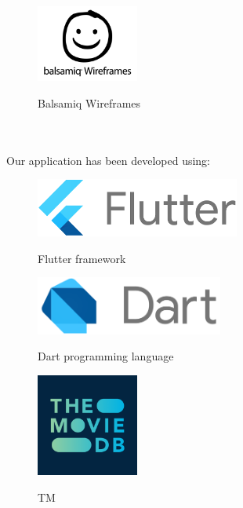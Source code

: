 \documentclass[12pt, a4paper]{article}
\numberwithin{figure}{section}
\begin{document}
\begin{center}
	\begin{figure}[H]
		\centering
		\includegraphics[width=0.3\textwidth]{images/programmiUsati/balsamiq.png}\\
		\caption{Balsamiq Wireframes}
	\end{figure}
\end{center}


\noindent
\mbox{}\\\\
Our application has been developed using:

\begin{center}
	\begin{minipage}{0.45\textwidth}
		\begin{figure}[H]
			\centering
			\includegraphics[width=0.6\textwidth]{images/programmiUsati/flutter.png}\\
			\caption{Flutter framework}
		\end{figure}
	\end{minipage}
	\hspace{0.02\linewidth}
	\begin{minipage}{0.45\textwidth}
		\begin{figure}[H]
			\centering
			\includegraphics[width=0.55\textwidth]{images/programmiUsati/dart.png}\\
			\caption{Dart programming language}
		\end{figure}
	\end{minipage}
\end{center}
\begin{center}
	\begin{figure}[H]
		\centering
		\includegraphics[width=0.3\textwidth]{images/programmiUsati/tmdb.png}\\
		\caption{TM}
	\end{figure}
\end{center}
\end{document}
